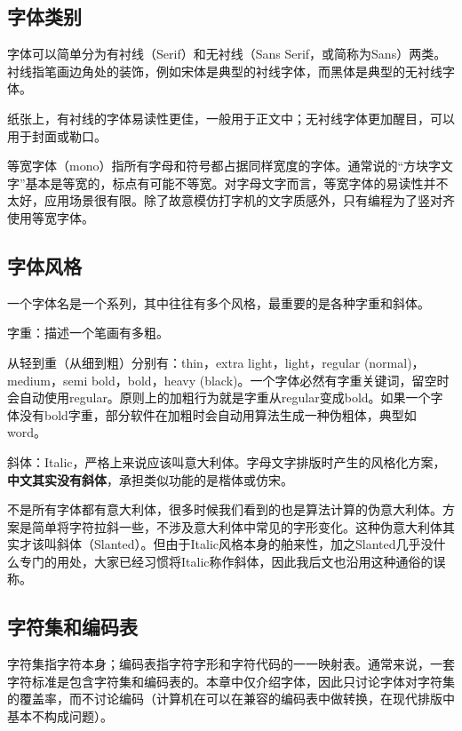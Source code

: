 \documentclass[10pt,openany]{book}
\begin{document}
\begin{sloppypar}
    \subsection{字体类别}

    字体可以简单分为有衬线（Serif）和无衬线（Sans Serif，或简称为Sans）两类。衬线指笔画边角处的装饰，例如宋体是典型的衬线字体，而黑体是典型的无衬线字体。

    纸张上，有衬线的字体易读性更佳，一般用于正文中；无衬线字体更加醒目，可以用于封面或勒口。

    等宽字体（mono）指所有字母和符号都占据同样宽度的字体。通常说的“方块字文字”基本是等宽的，标点有可能不等宽。对字母文字而言，等宽字体的易读性并不太好，应用场景很有限。除了故意模仿打字机的文字质感外，只有编程为了竖对齐使用等宽字体。

    \subsection{字体风格}

    一个字体名是一个系列，其中往往有多个风格，最重要的是各种字重和斜体。

    字重：描述一个笔画有多粗。

    从轻到重（从细到粗）分别有：thin，extra light，light，regular (normal)，medium，semi bold，bold，heavy (black)。一个字体必然有字重关键词，留空时会自动使用regular。原则上的加粗行为就是字重从regular变成bold。如果一个字体没有bold字重，部分软件在加粗时会自动用算法生成一种伪粗体，典型如word。

    斜体：Italic，严格上来说应该叫意大利体。字母文字排版时产生的风格化方案，\textbf{中文其实没有斜体}，承担类似功能的是楷体或仿宋。

    不是所有字体都有意大利体，很多时候我们看到的也是算法计算的伪意大利体。方案是简单将字符拉斜一些，不涉及意大利体中常见的字形变化。这种伪意大利体其实才该叫斜体（Slanted）。但由于Italic风格本身的舶来性，加之Slanted几乎没什么专门的用处，大家已经习惯将Italic称作斜体，因此我后文也沿用这种通俗的误称。

    \subsection{字符集和编码表}

    字符集指字符本身；编码表指字符字形和字符代码的一一映射表。通常来说，一套字符标准是包含字符集和编码表的。本章中仅介绍字体，因此只讨论字体对字符集的覆盖率，而不讨论编码（计算机在可以在兼容的编码表中做转换，在现代排版中基本不构成问题）。


\end{sloppypar}
\end{document}
